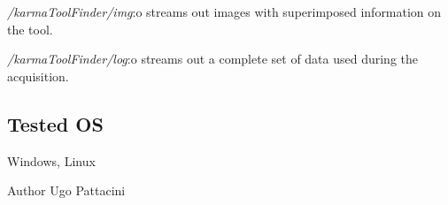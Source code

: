 \begin{DoxyItemize}
\begin{DoxyItemize}
\item {\itshape /karma\+Tool\+Finder/img}\+:o streams out images with superimposed information on the tool.
\item {\itshape /karma\+Tool\+Finder/log}\+:o streams out a complete set of data used during the acquisition.
\end{DoxyItemize}
\end{DoxyItemize}\hypertarget{group__karmaToolProjection_tested_os_sec}{}\subsection{Tested O\+S}\label{group__karmaToolProjection_tested_os_sec}
Windows, Linux

\begin{DoxyAuthor}{Author}
Ugo Pattacini 
\end{DoxyAuthor}

